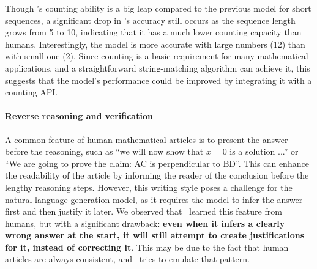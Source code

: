 Though \DV's counting ability is a big leap compared to the previous model for short sequences, a significant drop in \DV's accuracy still occurs as the sequence length grows from 5 to 10, indicating that it has a much lower counting capacity than humans. Interestingly, the model is more accurate with large numbers (12) than with small one (2). Since counting is a basic requirement for many mathematical applications, and a straightforward string-matching algorithm can achieve it, this suggests that the model's performance could be improved by integrating it with a counting API.

\paragraph{Reverse reasoning and verification}


A common feature of human mathematical articles is to present the answer before the reasoning, such as ``we will now show that $x = 0$ is a solution ...'' or ``We are going to prove the claim: AC is perpendicular to BD''. This can enhance the readability of the article by informing the reader of the conclusion before the lengthy reasoning steps. However, this writing style poses a challenge for the natural language generation model, as it requires the model to infer the answer first and then justify it later. We observed that \DV \ learned this feature from humans, but with a significant drawback: \textbf{even when it infers a clearly wrong answer at the start, it will still attempt to create justifications for it, instead of correcting it}. This may be due to the fact that human articles are always consistent, and \DV \ tries to emulate that pattern.


